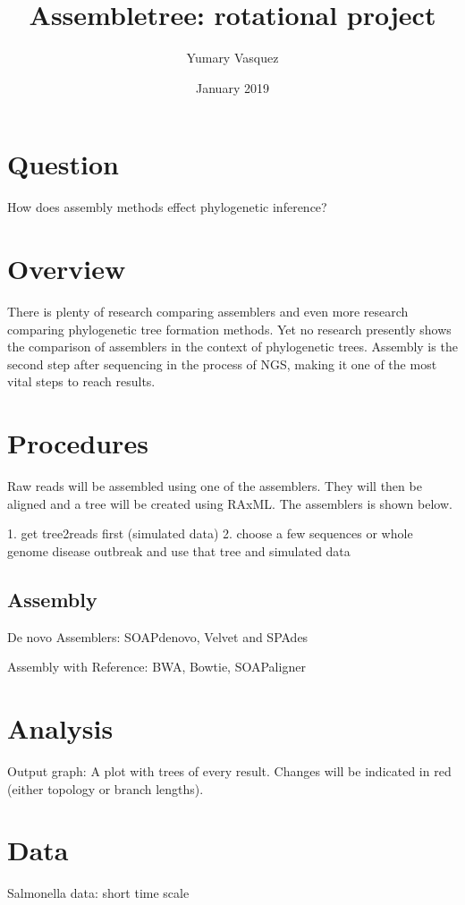 \documentclass[12pt]{extarticle}
\title{Assembletree: rotational project}
\author{Yumary Vasquez}
\date{January 2019}
\begin{document}
\maketitle

\section{Question}
How does assembly methods effect phylogenetic inference?


\section{Overview}
There is plenty of research comparing assemblers and even more research comparing phylogenetic tree formation methods. Yet no research presently shows the comparison of assemblers in the context of phylogenetic trees. Assembly is the second step after sequencing in the process of NGS, making it one of the most vital steps to reach results. 


\section{Procedures}
Raw reads will be assembled using one of the assemblers. They will then be aligned and a tree will be created using RAxML. The assemblers is shown below. 

1. get tree2reads first (simulated data)
2. choose a few sequences or whole genome disease outbreak and use that tree and simulated data

\subsection{Assembly}

De novo Assemblers: SOAPdenovo, Velvet and SPAdes

Assembly with Reference: BWA, Bowtie, SOAPaligner


\section{Analysis}
Output graph: A plot with trees of every result. Changes will be indicated in red (either topology or branch lengths). 


\section{Data}
Salmonella data: short time scale 




\end{document}
